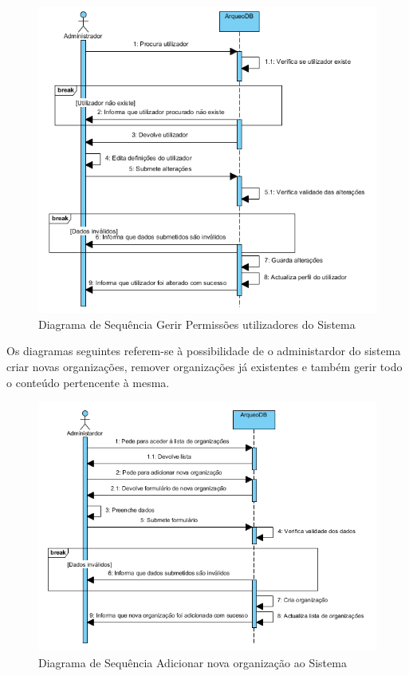﻿\documentclass[12pt,a4paper]{article}
\begin{document}
\begin{figure}[h!]
\centering
\includegraphics[scale=1]{sequencia/A_editarutilizador}
\caption{Diagrama de Sequência Gerir Permissões utilizadores do Sistema} 
\end{figure}   
  
\clearpage
Os diagramas seguintes referem-se à possibilidade de o administardor do sistema criar novas organizações, remover organizações já existentes e também gerir todo o conteúdo pertencente à mesma.\\

\begin{figure}[h!]
\centering
\includegraphics[scale=1]{sequencia/A_criarorganizacao}
\caption{Diagrama de Sequência Adicionar nova organização ao Sistema} 
\end{figure}  
\end{document}
